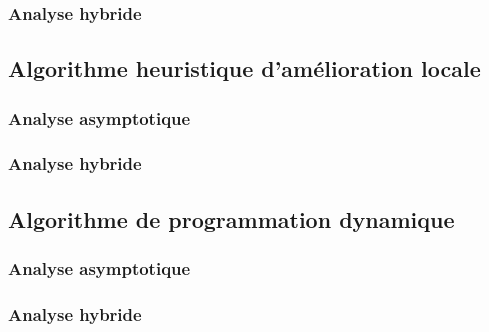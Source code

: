 \documentclass[a4paper, 12pt]{article} %
\begin{document}
\subsubsection*{Analyse hybride}
\subsection*{Algorithme heuristique d'amélioration locale}
\subsubsection*{Analyse asymptotique}
\subsubsection*{Analyse hybride}
\subsection*{Algorithme de programmation dynamique}
\subsubsection*{Analyse asymptotique}
\subsubsection*{Analyse hybride}
\end{document}
